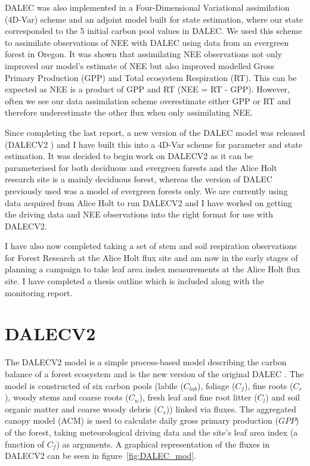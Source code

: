 \documentclass[11pt]{article}
\begin{document}
DALEC was also implemented in a Four-Dimensional Variational assimilation (4D-Var) scheme and an adjoint model built for state estimation, where our state corresponded to the 5 initial carbon pool values in DALEC. We used this scheme to assimilate observations of NEE with DALEC using data from an evergreen forest in Oregon. It was shown that assimilating NEE observations not only improved our model's estimate of NEE but also improved modelled Gross Primary Production (GPP) and Total ecosystem Respiration (RT). This can be expected as NEE is a product of GPP and RT (NEE = RT - GPP). However, often we see our data assimilation scheme overestimate either GPP or RT and therefore underestimate the other flux when only assimilating NEE. 

Since completing the last report, a new version of the DALEC model was released (DALECV2 \citep{Bloom2014}) and I have built this into a 4D-Var scheme for parameter and state estimation. It was decided to begin work on DALECV2 as it can be parameterised for both deciduous and evergreen forests and the Alice Holt research site is a mainly deciduous forest, whereas the version of DALEC previously used was a model of evergreen forests only. We are currently using data acquired from Alice Holt to run DALECV2 and I have worked on getting the driving data and NEE observations into the right format for use with DALECV2.

I have also now completed taking a set of stem and soil respiration observations for Forest Research at the Alice Holt flux site and am now in the early stages of planning a campaign to take leaf area index measurements at the Alice Holt flux site. I have completed a thesis outline which is included along with the monitoring report.            

\section{DALECV2}

The DALECV2 model is a simple process-based model describing the carbon balance of a forest ecosystem \citep{Bloom2014} and is the new version of the original DALEC \citep{williams2005improved}. The model is constructed of six carbon pools (labile ($C_{lab}$), foliage ($C_f$), fine roots ($C_r$), woody stems and coarse roots ($C_w$), fresh leaf and fine root litter ($C_l$) and soil organic matter and coarse woody debris ($C_s$)) linked via fluxes. The aggregated canopy model (ACM) \citep{williams1997predicting} is used to calculate daily gross primary production ($GPP$) of the forest, taking meteorological driving data and the site's leaf area index (a function of $C_f$) as arguments. A graphical representation of the fluxes in DALECV2 can be seen in figure~\ref{fig:DALEC_mod}.   
\end{document}
